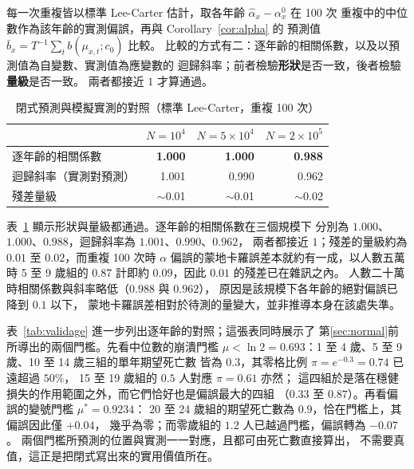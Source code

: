 \documentclass[UTF8, fontset=macnew, a4paper, 12pt]{ctexart}
\begin{document}
每一次重複皆以標準 Lee-Carter 估計，取各年齡 $\hat\alpha_x-\alpha^{0}_x$ 在 100 次
重複中的中位數作為該年齡的實測偏誤，再與 Corollary~\ref{cor:alpha} 的
預測值 $\bar b_x=T^{-1}\sum_t b(\mu_{x,t};c_0)$ 比較。
比較的方式有二：逐年齡的相關係數，以及以預測值為自變數、實測值為應變數的
迴歸斜率；前者檢驗\textbf{形狀}是否一致，後者檢驗\textbf{量級}是否一致。
兩者都接近 $1$ 才算通過。


\begin{table}[H]
\centering
\caption{閉式預測與模擬實測的對照（標準 Lee-Carter，重複 100 次）}
\small
\begin{tabular}{lrrr}
\toprule
 & $N=10^4$ & $N=5\times10^4$ & $N=2\times10^5$\\
\midrule
逐年齡的相關係數 & \textbf{1.000} & \textbf{1.000} & \textbf{0.988}\\
迴歸斜率（實測對預測） & 1.001 & 0.990 & 0.962\\
殘差量級 & $\sim$0.01 & $\sim$0.01 & $\sim$0.02\\
\bottomrule
\end{tabular}
\label{tab:valid}
\end{table}

表~\ref{tab:valid} 顯示形狀與量級都通過。逐年齡的相關係數在三個規模下
分別為 $1.000$、$1.000$、$0.988$，迴歸斜率為 $1.001$、$0.990$、$0.962$，
兩者都接近 $1$；殘差的量級約為 $0.01$ 至 $0.02$，而重複 100 次時
$\alpha$ 偏誤的蒙地卡羅誤差本就約有一成，以人數五萬時 5 至 9 歲組的
$0.87$ 計即約 $0.09$，因此 $0.01$ 的殘差已在雜訊之內。
人數二十萬時相關係數與斜率略低（$0.988$ 與 $0.962$），
原因是該規模下各年齡的絕對偏誤已降到 $0.1$ 以下，
蒙地卡羅誤差相對於待測的量變大，並非推導本身在該處失準。

表~\ref{tab:validage} 進一步列出逐年齡的對照；這張表同時展示了
第\ref{sec:normal}前所導出的兩個門檻。先看中位數的崩潰門檻
$\mu<\ln2=0.693$：1 至 4 歲、5 至 9 歲、10 至 14 歲三組的單年期望死亡數
皆為 $0.3$，其零格比例 $\pi=e^{-0.3}=0.74$ 已遠超過 $50\%$，
15 至 19 歲組的 $0.5$ 人對應 $\pi=0.61$ 亦然；
這四組於是落在穩健損失的作用範圍之外，而它們恰好也是偏誤最大的四組
（$0.33$ 至 $0.87$）。再看偏誤的變號門檻 $\mu^\ast=0.9234$：
20 至 24 歲組的期望死亡數為 $0.9$，恰在門檻上，其偏誤因此僅 $+0.04$，
幾乎為零；而零歲組的 $1.2$ 人已越過門檻，偏誤轉為 $-0.07$。
兩個門檻所預測的位置與實測一一對應，且都可由死亡數直接算出，
不需要真值，這正是把閉式寫出來的實用價值所在。
\end{document}
